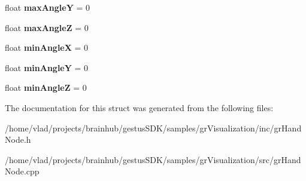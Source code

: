 \begin{DoxyCompactItemize}
float {\bfseries max\+AngleY} = 0
\item 
\mbox{\label{structGRHandNode_ab5b4dda58fbd09733015c8eef00201f4}} 
float {\bfseries max\+AngleZ} = 0
\item 
\mbox{\label{structGRHandNode_a4f22fefcd68430bd39da9ba217df0a32}} 
float {\bfseries min\+AngleX} = 0
\item 
\mbox{\label{structGRHandNode_a55bbc49c2d29a0494348ed30e726fdb5}} 
float {\bfseries min\+AngleY} = 0
\item 
\mbox{\label{structGRHandNode_a26d4b5c70856c38da498bdf02f6618cf}} 
float {\bfseries min\+AngleZ} = 0
\end{DoxyCompactItemize}


The documentation for this struct was generated from the following files\+:\begin{DoxyCompactItemize}
\item 
/home/vlad/projects/brainhub/gestus\+S\+D\+K/samples/gr\+Visualization/inc/gr\+Hand\+Node.\+h\item 
/home/vlad/projects/brainhub/gestus\+S\+D\+K/samples/gr\+Visualization/src/gr\+Hand\+Node.\+cpp\end{DoxyCompactItemize}
